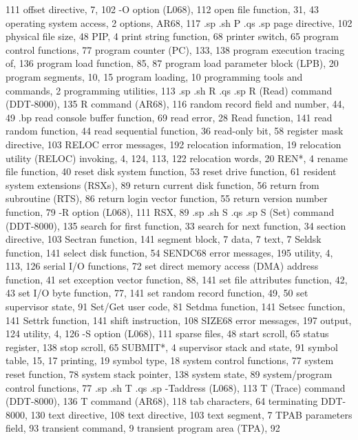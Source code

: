     111
offset directive, 7, 102
-O option (L068), 112
open file function, 31, 43
operating system access, 2
options, AR68, 117
.sp
.sh
P
.qs
.sp
page directive, 102
physical file size, 48
PIP, 4
print string function, 68
printer switch, 65
program control functions, 77
program counter (PC), 133, 
    138
program execution
  tracing of, 136
program load function, 85, 87
program load parameter block 
    (LPB), 20
program segments, 10, 15
program
  loading, 10
programming tools and 
    commands, 2
programming utilities, 113
.sp
.sh
R
.qs
.sp
R (Read) command (DDT-8000), 
    135
R command (AR68), 116
random record field and 
    number, 44, 49
.bp
read console buffer function, 
    69
read error, 28
Read function, 141
read random function, 44
read sequential function, 36
read-only bit, 58
register mask directive, 103
RELOC error messages, 192
relocation information, 19
relocation utility (RELOC)
  invoking, 4, 124, 113, 122 
relocation words, 20
REN*, 4
rename file function, 40
reset disk system function, 53
reset drive function, 61
resident system extensions 
    (RSXs), 89
return current disk function, 56
return from subroutine (RTS), 86
return login vector function, 55
return version number function, 
    79
-R option (L068), 111
RSX, 89
.sp
.sh
S
.qs
.sp
S (Set) command (DDT-8000), 135
search for first function, 33
search for next function, 34
section directive, 103
Sectran function, 141
segment
  block, 7
  data, 7
  text, 7
Seldsk function, 141
select disk function, 54
SENDC68 
  error messages, 195
  utility, 4, 113, 126
serial I/O functions, 72
set direct memory access (DMA) 
  address function, 41
set exception vector function, 
    88, 141
set file attributes function, 
    42, 43
set I/O byte function, 77, 141
set random record function, 
    49, 50
set supervisor state, 91
Set/Get user code, 81
Setdma function, 141
Setsec function, 141
Settrk function, 141
shift instruction, 108
SIZE68 
  error messages, 197
  output, 124
  utility, 4, 126
-S option (L068), 111
sparse files, 48
start scroll, 65
status register, 138
stop scroll, 65
SUBMIT*, 4
supervisor stack and state, 91
symbol table, 15, 17
  printing, 19
symbol type, 18
system control functions, 77
system reset function, 78
system stack pointer, 138
system state, 89
system/program control 
     functions, 77
.sp
.sh
T
.qs
.sp
-Taddress (L068), 113
T (Trace) command (DDT-8000), 
    136
T command (AR68), 118
tab characters, 64
terminating DDT-8000, 130
text directive, 108
text directive, 103
text segment, 7
TPAB parameters field, 93
transient command, 9
transient program area 
    (TPA), 92
